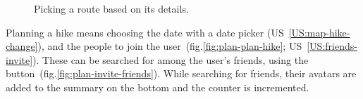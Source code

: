 \begin{figure}[h!]
    \centering
    \hfill
    \hfill
    \caption{Picking a route based on its details.}
    \label{fig:plan-pick-route}
\end{figure}

Planning a hike means choosing the date with a date picker (US~\ref{US:map-hike-change}), and the people to join the user~(fig.\ref{fig:plan-plan-hike}; US~\ref{US:friends-invite}).
These can be searched for among the user's friends, using the  button~(fig.\ref{fig:plan-invite-friends}).
While searching for friends, their avatars are added to the summary on the bottom and the counter is incremented.

